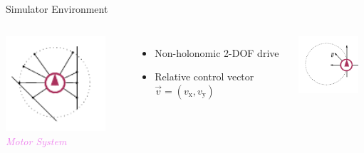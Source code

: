 \documentclass[aspectratio=169]{beamer}
\begin{document}
\begin{frame}{Simulator Environment}
\begin{columns}[t]
		\includegraphics[width=0.85\textwidth]{media/radar_1.pdf}
		\emph{\textcolor{violet}{Motor System}}
		\begin{itemize}
			\item Non-holonomic 2-DOF drive
			\item Relative control vector $\vec v = (v_\mathrm{x}, v_\mathrm{y})$
		\end{itemize}
		\vspace{0.35cm}
		\centering
		\includegraphics[width=0.9\textwidth]{media/motor.pdf}
	\end{columns}
\end{frame}
\end{document}
